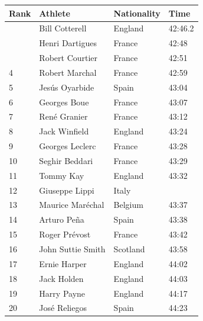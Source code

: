 \documentclass{article}
\begin{document}
\begin{tabular}{llll}
\toprule
Rank & Athlete & Nationality & Time \\
\midrule
 & Bill Cotterell & England & 42:46.2 \\
 & Henri Dartigues & France & 42:48 \\
 & Robert Courtier & France & 42:51 \\
4 & Robert Marchal & France & 42:59 \\
5 & Jesús Oyarbide & Spain & 43:04 \\
6 & Georges Boue & France & 43:07 \\
7 & René Granier & France & 43:12 \\
8 & Jack Winfield & England & 43:24 \\
9 & Georges Leclerc & France & 43:28 \\
10 & Seghir Beddari & France & 43:29 \\
11 & Tommy Kay & England & 43:32 \\
12 & Giuseppe Lippi & Italy &  \\
13 & Maurice Maréchal & Belgium & 43:37 \\
14 & Arturo Peña & Spain & 43:38 \\
15 & Roger Prévost & France & 43:42 \\
16 & John Suttie Smith & Scotland & 43:58 \\
17 & Ernie Harper & England & 44:02 \\
18 & Jack Holden & England & 44:03 \\
19 & Harry Payne & England & 44:17 \\
20 & José Reliegos & Spain & 44:23 \\
\bottomrule
\end{tabular}
\end{document}
